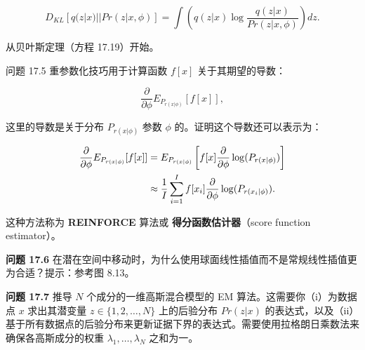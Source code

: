\begin{equation}
D_{KL} [q(z|x) || Pr(z|x, \phi)] = \int (q(z|x) \log \frac{q(z|x)}{Pr(z|x, \phi)}) dz. 
\end{equation}

从贝叶斯定理（方程 17.19）开始。

问题 17.5 重参数化技巧用于计算函数 \(f[x]\) 关于其期望的导数：

\begin{equation}
\frac{\partial}{\partial\phi} E_{P_{r(x|\phi)}} [f[x]], 
\end{equation}

这里的导数是关于分布 \(P_{r(x|\phi)}\) 参数 \(\phi\) 的。证明这个导数还可以表示为：


\begin{align}
\frac{\partial}{\partial\phi} E_{P_{r(x|\phi)}} [f[x]] &= E_{P_{r(x|\phi)}} \left[ f[x] \frac{\partial}{\partial\phi} \log(P_{r(x|\phi)}) \right] \notag \\
&\approx \frac{1}{I} \sum_{i=1}^{I} f[x_i] \frac{\partial}{\partial\phi} \log(P_{r(x_i|\phi)}). 
\end{align} 


这种方法称为 \textbf{REINFORCE} 算法或 \textbf{得分函数估计器}（score function estimator）。

\textbf{问题 17.6} 在潜在空间中移动时，为什么使用球面线性插值而不是常规线性插值更为合适？提示：参考图 8.13。

\textbf{问题 17.7} 推导 \(N\) 个成分的一维高斯混合模型的 EM 算法。这需要你（i）为数据点 \(x\) 求出其潜变量 \(z \in \{1, 2, \ldots, N\}\) 上的后验分布 \(Pr(z|x)\) 的表达式，以及（ii）基于所有数据点的后验分布来更新证据下界的表达式。需要使用拉格朗日乘数法来确保各高斯成分的权重 \(\lambda_1, \ldots, \lambda_N\) 之和为一。
